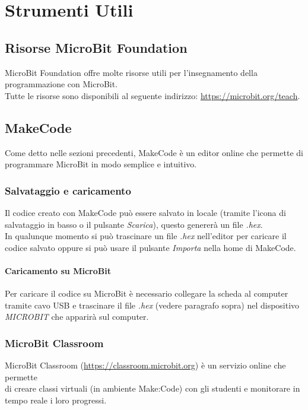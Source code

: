 \documentclass[../../docenti.tex]{subfiles}
\begin{document}
\section{Strumenti Utili}

\subsection{Risorse MicroBit Foundation}
MicroBit Foundation offre molte risorse utili per l'insegnamento della programmazione con MicroBit.\\
Tutte le risorse sono disponibili al seguente indirizzo: \url{https://microbit.org/teach}.

\subsection{MakeCode}
Come detto nelle sezioni precedenti, MakeCode è un editor online che permette di programmare MicroBit in modo semplice e intuitivo.

\subsubsection{Salvataggio e caricamento}
\label{sec:makecode_save_load}
Il codice creato con MakeCode può essere salvato in locale (tramite l'icona di salvataggio in basso o il pulsante \textit{Scarica}), questo genererà un file \textit{.hex}.\\
In qualunque momento si può trascinare un file \textit{.hex} nell'editor per caricare il codice salvato oppure si può usare il pulsante \textit{Importa} nella home di MakeCode.

\paragraph{Caricamento su MicroBit}
Per caricare il codice su MicroBit è necessario collegare la scheda al computer tramite cavo USB e trascinare il file \textit{.hex} (vedere paragrafo sopra) nel dispositivo \textit{MICROBIT} che apparirà sul computer.

\subsubsection{MicroBit Classroom}
MicroBit Classroom (\url{https://classroom.microbit.org}) è un servizio online che permette\\ di creare classi virtuali (in ambiente Make:Code) con gli studenti e monitorare in tempo reale i loro progressi.
\end{document}
